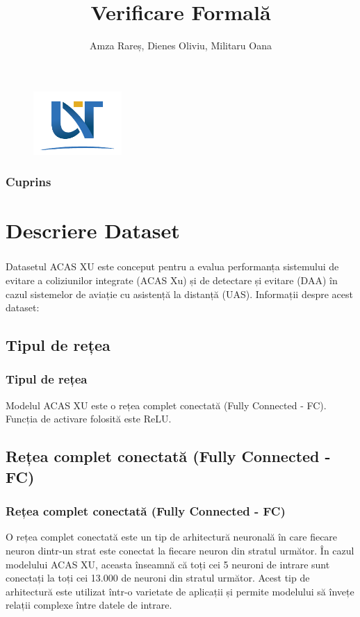 \documentclass{beamer}
\title{Verificare Formală}
\author{Amza Rareș, Dienes Oliviu, Militaru Oana}
\institute{Universitatea de Vest din Timișoara\\
Facultatea de Matematică și Informatică, Inginerie Software}
\begin{document}
\begin{frame}
  \titlepage
  \begin{figure}
    \centering
    \includegraphics[width=0.3\textwidth]{Logo-UVT.png}
  \end{figure}
\end{frame}

\begin{frame}
  \frametitle{Cuprins}
  \tableofcontents
\end{frame}

\section{Descriere Dataset }
\begin{frame}
  \frametitle{}
    Datasetul ACAS XU este conceput pentru a evalua performanța sistemului de
    evitare a coliziunilor integrate (ACAS Xu) și de detectare și evitare (DAA) în cazul sistemelor de aviație cu asistență la distanță (UAS). \cite{acasxu-github}
  Informații despre acest dataset:  

\end{frame}
\subsection{Tipul de rețea}
\begin{frame}
  \frametitle{Tipul de rețea}
  Modelul ACAS XU este o rețea complet conectată (Fully Connected - FC).
  Funcția de activare folosită este ReLU. \cite{deepai-relu} %
\end{frame}

\subsection{Rețea complet conectată (Fully Connected - FC)}
\begin{frame}
  \frametitle{Rețea complet conectată (Fully Connected - FC)}

  O rețea complet conectată este un tip de arhitectură neuronală în care fiecare neuron dintr-un strat este conectat la fiecare neuron din stratul următor.
  În cazul modelului ACAS XU, aceasta înseamnă că toți cei 5 neuroni de intrare sunt conectați la toți cei 13.000 de neuroni din stratul următor.
  Acest tip de arhitectură este utilizat într-o varietate de aplicații și permite modelului să învețe relații complexe între datele de intrare. \cite{arxiv2022} \cite{ieee2019} \cite{springer-chapter}
\end{frame}
\end{document}
